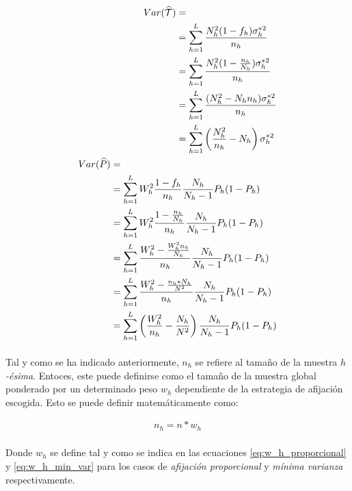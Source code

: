 \documentclass{article}
\begin{document}
    \begin{align}
      \label{eq:tau_var}
      \begin{split}
        Var(\widehat{\mathcal{T}}) &= \\
        &= \sum\limits_{h=1}^L\frac{N_h^2 (1-f_h)\sigma_h^{*2}}{n_h} \\
        &= \sum\limits_{h=1}^L\frac{N_h^2 (1-\frac{n_h}{N_h})\sigma_h^{*2}}{n_h} \\
        &= \sum\limits_{h=1}^L\frac{(N_h^2- N_hn_h)\sigma_h^{*2}}{n_h} \\
        &= \sum\limits_{h=1}^L\left(\frac{N_h^2}{n_h}- N_h\right)\sigma_h^{*2}
      \end{split} \\
    \label{eq:p_var}
      \begin{split}
        Var(\widehat{P}) &=\\
        &= \sum\limits_{h=1}^LW_h^2\frac{1-f_h}{n_h}\frac{N_h}{N_h-1}P_h(1-P_h) \\
        &= \sum\limits_{h=1}^LW_h^2\frac{1-\frac{n_h}{N_h}}{n_h}\frac{N_h}{N_h-1}P_h(1-P_h) \\
        &= \sum\limits_{h=1}^L\frac{W_h^2-\frac{W_h^2n_h}{N_h}}{n_h}\frac{N_h}{N_h-1}P_h(1-P_h) \\
        &= \sum\limits_{h=1}^L\frac{W_h^2-\frac{n_h*N_h}{N^2}}{n_h}\frac{N_h}{N_h-1}P_h(1-P_h) \\
        &= \sum\limits_{h=1}^L\left(\frac{W_h^2}{n_h} - \frac{N_h}{N^2}\right)\frac{N_h}{N_h-1}P_h(1-P_h)
      \end{split}
    \end{align}

    \paragraph{}
    Tal y como se ha indicado anteriormente, $n_h$ se refiere al tamaño de la muestra \emph{$h$-ésima}. Entoces, este puede definirse como el tamaño de la muestra global ponderado por un determinado peso $w_h$  dependiente de la estrategia de afijación escogida. Esto se puede definir matemáticamente como:

    \begin{align}
      n_h = n * w_h
    \end{align}

    \paragraph{}
    Donde $w_h$ se define tal y como se indica en las ecuaciones \eqref{eq:w_h_proporcional} y \eqref{eq:w_h_min_var} para los casos de \emph{afijación proporcional} y \emph{mínima varianza} respectivamente.
\end{document}
